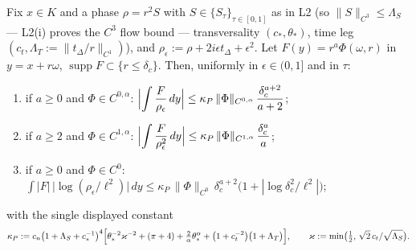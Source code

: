 \begin{lemma}
\label{port:lem-pair}
Fix $x\in K$ and a phase $\rho=r^2S$ with $S\in\{S_\tau\}_{\tau\in[0,1]}$
as in L2 (so $\|S\|_{C^{3}}\le\Lambda_S$ --- L2(i) proves the $C^{3}$
flow bound --- transversality $(c_*,\theta_*)$,
time leg $(c_t,\Lambda_T:=\|t_\Delta/r\|_{C^1})$), and
$\rho_\epsilon:=\rho+2i\epsilon t_\Delta+\epsilon^2$. Let
$F(y)=r^{a}\Phi(\omega,r)$ in $y=x+r\omega$, $\operatorname{supp}F
\subset\{r\le\delta_c\}$. Then, uniformly in $\epsilon\in(0,1]$ and in
$\tau$:
\begin{enumerate}[label=\textup{(P\arabic*)},leftmargin=*,nosep]
\item if $a\ge0$ and $\Phi\in C^{0,\alpha}$:
  $\displaystyle\Bigl|\int\frac{F}{\rho_\epsilon}\,dy\Bigr|
  \le\kappa_{P}\,\|\Phi\|_{C^{0,\alpha}}\,\frac{\delta_c^{a+2}}{a+2}$;
\item if $a\ge2$ and $\Phi\in C^{1,\alpha}$:
  $\displaystyle\Bigl|\int\frac{F}{\rho_\epsilon^{2}}\,dy\Bigr|
  \le\kappa_{P}\,\|\Phi\|_{C^{1,\alpha}}\,\frac{\delta_c^{a}}{a}$;
\item if $a\ge0$ and $\Phi\in C^{0}$:
  $\displaystyle\int|F|\,\bigl|\log(\rho_\epsilon/\ell^2)\bigr|\,dy
  \le\kappa_{P}\,\|\Phi\|_{C^{0}}\,\delta_c^{a+2}
  \bigl(1+|\log\delta_c^2/\ell^2|\bigr)$;
\end{enumerate}
with the single displayed constant
\begin{equation}\label{port:eq-kpair}
  \kappa_{P}:=c_n\bigl(1+\Lambda_S+c_*^{-1}\bigr)^{4}
  \Bigl[\theta_*^{-2}\varkappa^{-2}+(\pi+4)+\tfrac{2}{\alpha}\theta_*^{\alpha}
  +\bigl(1+c_t^{-2}\bigr)\bigl(1+\Lambda_T\bigr)\Bigr],\qquad
  \varkappa:=\min\bigl(\tfrac12,\,\sqrt2\,c_t/\sqrt{\Lambda_S}\bigr).
\end{equation}
\end{lemma}
